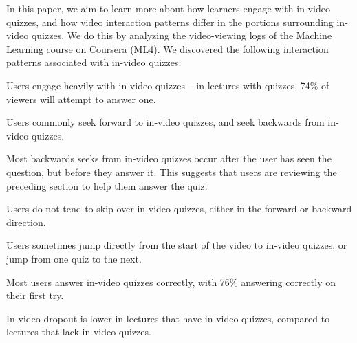 \documentclass{sigchi}
\begin{document}
In this paper, we aim to learn more about how learners engage with in-video quizzes, and how video interaction patterns differ in the portions surrounding in-video quizzes. We do this by analyzing the video-viewing logs of the Machine Learning course on Coursera (ML4). We discovered the following interaction patterns associated with in-video quizzes:


\begin{compactitem}
\item Users engage heavily with in-video quizzes -- in lectures with quizzes, 74\% of viewers will attempt to answer one. %
\item Users commonly seek forward to in-video quizzes, and seek backwards from in-video quizzes.
\item Most backwards seeks from in-video quizzes occur after the user has seen the question, but before they answer it. This suggests that users are reviewing the preceding section to help them answer the quiz. %
\item Users do not tend to skip over in-video quizzes, either in the forward or backward direction. %
\item Users sometimes jump directly from the start of the video to in-video quizzes, or jump from one quiz to the next. %
\item Most users answer in-video quizzes correctly, with 76\% answering correctly on their first try.
\item In-video dropout is lower in lectures that have in-video quizzes, compared to lectures that lack in-video quizzes.
\end{compactitem}
\end{document}
